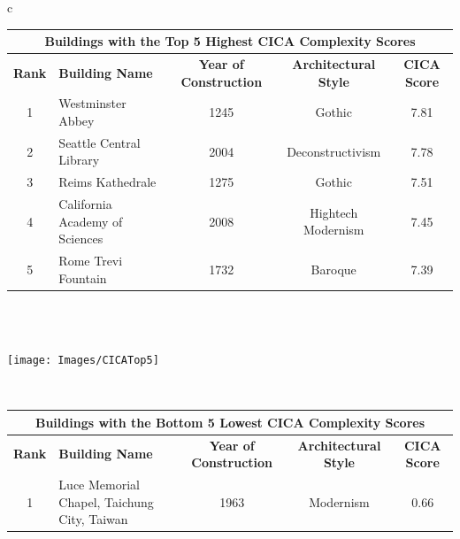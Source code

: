 \begin{linenumbers}
\begin{table}[htb]
\begin{tabular}{c}
    \begin{minipage}{\textwidth}
        \centering
        \label{tab:Top5andBottom5CICAcomplexityScores}
        \begin{tabularx}{\linewidth}{c X c c c}
        \toprule
        \multicolumn{5}{c}{\textbf{Buildings with the Top 5 Highest CICA Complexity Scores}} \\
        \hline
        \textbf{Rank} & \textbf{Building Name} & \textbf{Year of Construction} & \textbf{Architectural Style} & \textbf{CICA Score} \\
        \hline
        1 & Westminster Abbey & 1245 & Gothic & 7.81 \\
        2 & Seattle Central Library & 2004 & Deconstructivism & 7.78 \\
        3 & Reims Kathedrale & 1275 & Gothic & 7.51 \\
        4 & California Academy of Sciences & 2008 & Hightech Modernism & 7.45 \\
        5 & Rome Trevi Fountain & 1732 & Baroque & 7.39 \\
        \hline
        \end{tabularx}
    \end{minipage}
    \\
    \\
    \begin{minipage}{\textwidth}
        \centering
        \texttt{[image: Images/CICATop5]}
        \label{fig:CICATop5scores}
    \end{minipage}
    \\
    \begin{minipage}{\textwidth}
        \centering
        \begin{tabularx}{\linewidth}{c X c c c}
        \hline
        \multicolumn{5}{c}{\textbf{Buildings with the Bottom 5 Lowest CICA Complexity Scores}} \\
        \hline
        \textbf{Rank} & \textbf{Building Name} & \textbf{Year of Construction} & \textbf{Architectural Style} & \textbf{CICA Score} \\
        \hline
        1 & Luce Memorial Chapel, Taichung City, Taiwan & 1963 & Modernism & 0.66 \\

\end{tabularx}
\end{minipage}
\end{tabular}
\end{table}
\end{linenumbers}
